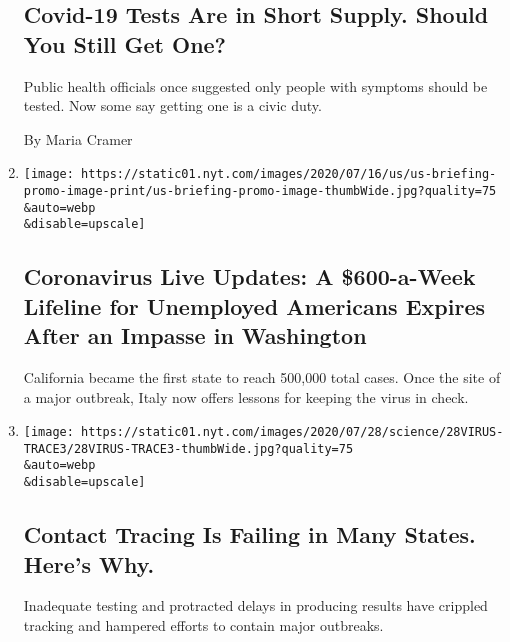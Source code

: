 \begin{enumerate}
  \hypertarget{covid-19-tests-are-in-short-supply-should-you-still-get-one}{%
  \subsection{Covid-19 Tests Are in Short Supply. Should You Still Get
  One?}\label{covid-19-tests-are-in-short-supply-should-you-still-get-one}}

  Public health officials once suggested only people with symptoms
  should be tested. Now some say getting one is a civic duty.

  By Maria Cramer
\item
  \href{/2020/07/31/world/coronavirus-covid-19.html}{}

  \texttt{[image: https://static01.nyt.com/images/2020/07/16/us/us-briefing-promo-image-print/us-briefing-promo-image-thumbWide.jpg?quality=75\\\&auto=webp\\\&disable=upscale]}

  \hypertarget{coronavirus-live-updates-a-600-a-week-lifeline-for-unemployed-americans-expires-after-an-impasse-in-washington}{%
  \subsection{Coronavirus Live Updates: A \$600-a-Week Lifeline for
  Unemployed Americans Expires After an Impasse in
  Washington}\label{coronavirus-live-updates-a-600-a-week-lifeline-for-unemployed-americans-expires-after-an-impasse-in-washington}}

  California became the first state to reach 500,000 total cases. Once
  the site of a major outbreak, Italy now offers lessons for keeping the
  virus in check.
\item
  \href{/2020/07/31/health/covid-contact-tracing-tests.html}{}

  \texttt{[image: https://static01.nyt.com/images/2020/07/28/science/28VIRUS-TRACE3/28VIRUS-TRACE3-thumbWide.jpg?quality=75\\\&auto=webp\\\&disable=upscale]}

  \hypertarget{contact-tracing-is-failing-in-many-states-heres-why}{%
  \subsection{Contact Tracing Is Failing in Many States. Here's
  Why.}\label{contact-tracing-is-failing-in-many-states-heres-why}}

  Inadequate testing and protracted delays in producing results have
  crippled tracking and hampered efforts to contain major outbreaks.


\end{enumerate}
